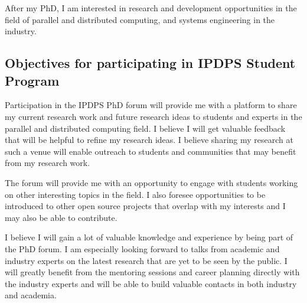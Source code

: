 After my PhD, I am interested in research and development opportunities in 
the field of parallel and distributed computing, and systems engineering in the 
industry.


\subsection{Objectives for participating in IPDPS Student Program}

Participation in the IPDPS PhD forum will provide me with a platform to share my 
current research work and future research ideas to students and experts in
the parallel and distributed computing field. I believe I will get valuable 
feedback that will be helpful to refine my research ideas. I believe sharing my 
research at such a venue will enable outreach to students and communities that 
may benefit from my research work.

The forum will provide me with an opportunity to engage with students working
on other interesting topics in the field. I also foresee opportunities to be 
introduced to other open source projects that overlap with my interests and
I may also be able to contribute.

I believe I will gain a lot of valuable knowledge and experience by being part
of the PhD forum. I am especially looking forward to talks from academic and 
industry experts on the latest research that are yet to be seen by the public. 
I will greatly benefit from the mentoring sessions and career planning directly 
with the industry experts and will be able to build valuable contacts in both 
industry and academia.

